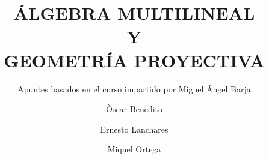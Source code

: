 \documentclass[12pt,es]{notes}
\title{ÁLGEBRA MULTILINEAL\\ Y\\ GEOMETRÍA PROYECTIVA}
\author{Òscar Benedito\and Ernesto Lanchares\and Miquel Ortega}
\subtitle{Apuntes basados en el curso impartido por Miguel Ángel Barja}
\begin{document}
    \maketitle

\iffalse
\setcounter{chapter}{-1}







\printindex
\fi
\end{document}
